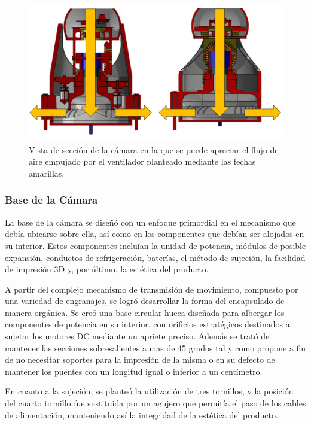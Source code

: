     \begin{figure}[H]
    \centering
    \begin{adjustbox}{width=\linewidth}
    \includegraphics{media/vista_seccion_aire.png}
    \end{adjustbox}
    \caption{\label{fig:flujoDeAire} Vista de sección de la cámara en la que se puede apreciar el flujo de aire empujado por el ventilador planteado mediante las fechas amarillas.}
    \end{figure}

    \subsubsection{Base de la Cámara}
    La base de la cámara se diseñó con un enfoque primordial en el mecanismo que debía ubicarse sobre ella, así como en los componentes que debían ser alojados en su interior. Estos componentes incluían la unidad de potencia, módulos de posible expansión, conductos de refrigeración, baterías, el método de sujeción, la facilidad de impresión 3D y, por último, la estética del producto.

    A partir del complejo mecanismo de transmisión de movimiento, compuesto por una variedad de engranajes, se logró desarrollar la forma del encapsulado de manera orgánica. Se creó una base circular hueca diseñada para albergar los componentes de potencia en su interior, con orificios estratégicos destinados a sujetar los motores DC mediante un apriete preciso. Además se trató de mantener las secciones sobresalientes a mas de 45 grados tal y como propone \cite{Redwood_2017} a fin de no necesitar soportes para la impresión de la misma o en su defecto de mantener los puentes con un longitud igual o inferior a un centímetro.
    
    En cuanto a la sujeción, se planteó la utilización de tres tornillos, y la posición del cuarto tornillo fue sustituida por un agujero que permitía el paso de los cables de alimentación, manteniendo así la integridad de la estética del producto.
    
